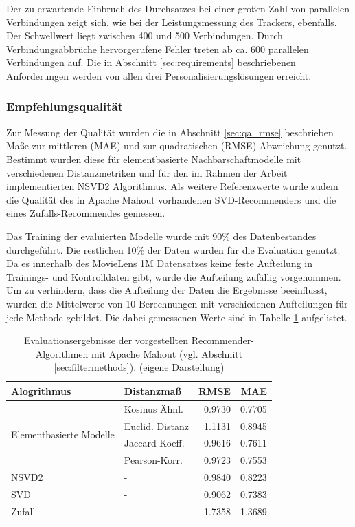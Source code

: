 Der zu erwartende Einbruch des Durchsatzes bei einer großen Zahl von parallelen Verbindungen zeigt sich, wie bei der Leistungsmessung des Trackers, ebenfalls. Der Schwellwert liegt zwischen 400 und 500  Verbindungen. Durch Verbindungsabbrüche hervorgerufene Fehler treten ab ca. 600 parallelen Verbindungen auf. Die in Abschnitt \ref{sec:requirements} beschriebenen Anforderungen werden von allen drei Personalisierungslösungen erreicht.

\subsubsection{Empfehlungsqualität}

Zur Messung der Qualität wurden die in Abschnitt \ref{sec:qa_rmse} beschrieben Maße zur mittleren (\acs{MAE}) und zur quadratischen (\acs{RMSE}) Abweichung genutzt. Bestimmt wurden diese für elementbasierte Nachbarschaftmodelle mit verschiedenen Distanzmetriken und für den im Rahmen der Arbeit implementierten NSVD2 Algorithmus. Als weitere Referenzwerte wurde zudem die Qualität des in Apache Mahout vorhandenen SVD-Recommenders und die eines Zufalls-Recommendes gemessen.

Das Training der evaluierten Modelle wurde mit 90\% des Datenbestandes durchgeführt. Die restlichen 10\% der Daten wurden für die Evaluation genutzt. Da es innerhalb des MovieLens 1M Datensatzes keine feste Aufteilung in Trainings- und Kontrolldaten gibt, wurde die Aufteilung zufällig vorgenommen. Um zu verhindern, dass die Aufteilung der Daten die Ergebnisse beeinflusst, wurden die Mittelwerte von 10 Berechnungen mit verschiedenen Aufteilungen für jede Methode gebildet. Die dabei gemessenen Werte sind in Tabelle \ref{tab:rmse-eval} aufgelistet.

\vfill
\begin{table}[h]
  \centering
  \begin{minipage}[b]{5in}
  \begin{tabular}{ | l | l || r | r | }
  \hline
  \textbf { Alogrithmus } &   \textbf { Distanzmaß } &   \textbf { RMSE } &   \textbf { MAE } \\ \hline
  \multirow{4}{*}{Elementbasierte Modelle}  & Kosinus Ähnl. & 0.9730 & 0.7705 \\ 
 & Euclid. Distanz & 1.1131 & 0.8945\\   
 & Jaccard-Koeff. & 0.9616 & 0.7611 \\
 & Pearson-Korr.  & 0.9723 & 0.7553 \\ \hline
  NSVD2 & - & 	0.9840  & 0.8223 \\
  SVD &  - &	0.9062 & 0.7383 \\ \hline
  Zufall & -	&	1.7358 & 1.3689 \\ \hline
  \end{tabular}
  \caption{\footnotesize Evaluationsergebnisse der vorgestellten Recommender-Algorithmen mit Apache Mahout  (vgl. Abschnitt \ref{sec:filtermethods}). { \scriptsize (eigene Darstellung)}}
  \label{tab:rmse-eval}
\end{minipage}
\end{table}

